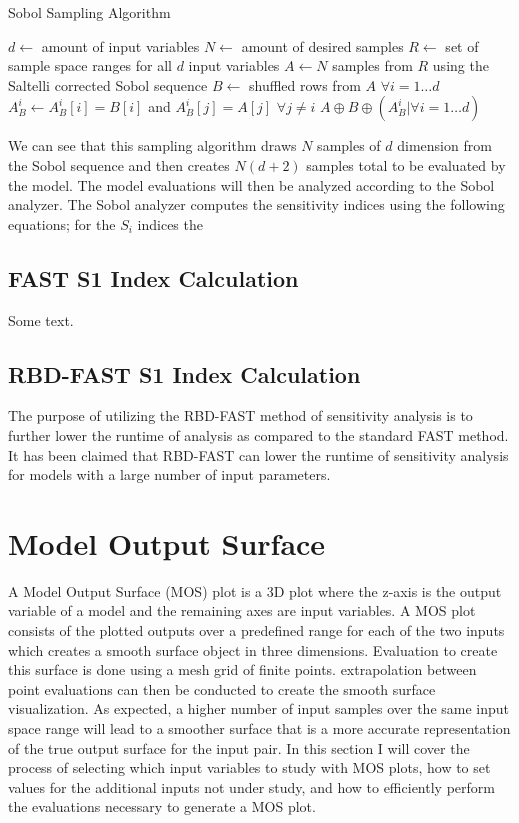 \FloatBarrier
\begin{algorithm}
  \caption{Sobol Sampling Algorithm}
  \label{sobol_sample_alg}
  \begin{algorithmic}[1]
    \Require $d \gets $ amount of input variables
    \Require $N \gets $ amount of desired samples
    \Require $R \gets $ set of sample space ranges for all $d$ input variables
    \State $A \gets N$ samples from $R$ using the Saltelli corrected Sobol sequence
    \State $B \gets $ shuffled rows from $A$
    \State $\forall i = 1 \ldots d$ $A_{B}^i \gets A_{B}^i[i] = B[i]$ and $A_{B}^i[j] = A[j]$ $\forall j \neq i$
    \Return $A \oplus B \oplus (A_{B}^i | \forall i = 1 \ldots d)$
  \end{algorithmic}
\end{algorithm}
\FloatBarrier

We can see that this sampling algorithm draws $N$ samples of $d$ dimension from the Sobol sequence and then creates $N(d+2)$ samples total to be evaluated by the model. The model evaluations will then be analyzed according to the Sobol analyzer. The Sobol analyzer computes the sensitivity indices using the following equations; for the $S_i$ indices the

\subsection{FAST S1 Index Calculation\label{sec:fast_analysis}}
Some text.

\subsection{RBD-FAST S1 Index Calculation\label{sec:rbd_fast_analysis}}
The purpose of utilizing the RBD-FAST method of sensitivity analysis is to further lower the runtime of analysis as compared to the standard FAST method. It has been claimed that RBD-FAST can lower the runtime of sensitivity analysis for models with a large number of input parameters.

\section{Model Output Surface\label{sec:out_surf}}
A Model Output Surface (MOS) plot is a 3D plot where the z-axis is the output variable of a model and the remaining axes are input variables. A MOS plot consists of the plotted outputs over a predefined range for each of the two inputs which creates a smooth surface object in three dimensions. Evaluation to create this surface is done using a mesh grid of finite points. extrapolation between point evaluations can then be conducted to create the smooth surface visualization. As expected, a higher number of input samples over the same input space range will lead to a smoother surface that is a more accurate representation of the true output surface for the input pair. In this section I will cover the process of selecting which input variables to study with MOS plots, how to set values for the additional inputs not under study, and how to efficiently perform the evaluations necessary to generate a MOS plot.

